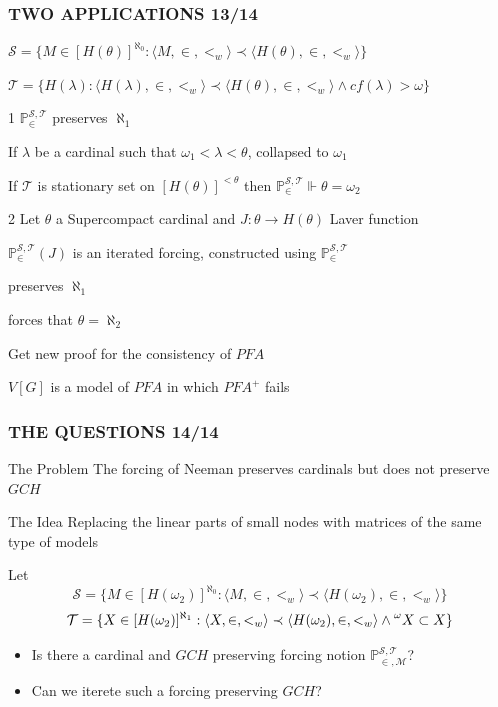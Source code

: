 \documentclass{beamer}
\begin{document}
\begin{frame}
\frametitle{TWO APPLICATIONS \hspace{56mm}13/14}
$\mathcal{S}= \{M \in [H(\theta)]^{\aleph_0} : \langle M, \in, <_w \rangle \prec \langle H(\theta), \in, <_w \rangle \}$

$\mathcal{T}= \{H(\lambda) : \langle H(\lambda), \in, <_w \rangle \prec \langle H(\theta), \in, <_w \rangle \land cf(\lambda) > \omega \}$
\begin{block}{1}
$\mathbb{P}_{\in}^{\mathcal{S}, \mathcal{T}}$ preserves $\aleph_1$

If $\lambda$ be a cardinal such that $\omega_1 < \lambda < \theta$, collapsed to $\omega_1$

If $\mathcal{T}$ is stationary set on $[H(\theta)]^{<\theta}$ then $\mathbb{P}_{\in}^{\mathcal{S}, \mathcal{T}} \Vdash \theta=\omega_2$
\end{block}
\pause
\vspace{-2mm}
\begin{block}{2}
Let $\theta$ a Supercompact cardinal and $J: \theta \longrightarrow H(\theta)$ Laver function

$\mathbb{P}_{\in}^{\mathcal{S}, \mathcal{T}}(J)$ is an iterated forcing, constructed using $\mathbb{P}_{\in}^{\mathcal{S}, \mathcal{T}}$

preserves $\aleph_1$

forces that $\theta = \aleph_2$

Get new proof for the consistency of $PFA$

$V[G]$ is a model of $PFA$ in which $PFA^+$ fails
\end{block}
\end{frame}
\begin{frame}
\frametitle{THE QUESTIONS \hspace{66.5mm}14/14}
\begin{block}{The Problem}
The forcing of Neeman preserves cardinals but does not preserve $GCH$
\end{block}
\pause
\begin{block}{The Idea}
Replacing the linear parts of small nodes with matrices of the same type of models
\end{block}
\pause
Let
\vspace{-5mm}
$$\mathcal{S}= \{M \in [H(\omega_2)]^{\aleph_0} : \langle M, \in, <_w \rangle \prec \langle H(\omega_2), \in, <_w \rangle \}$$
$$\mathcal{T}= \{X \in [H(\omega_2)]^{\aleph_1} : \langle X, \in, <_w \rangle \prec \langle H(\omega_2), \in, <_w \rangle \land \prescript{\omega}{}{X} \subset X \}$$
\vspace{-5mm}
\begin{itemize}
\item Is there a cardinal and $GCH$ preserving forcing notion $\mathbb{P}_{\in, \mathcal{M}}^{\mathcal{S}, \mathcal{T}}$?
\item Can we iterete such a forcing preserving $GCH$?
\end{itemize}
\end{frame}
\end{document}
